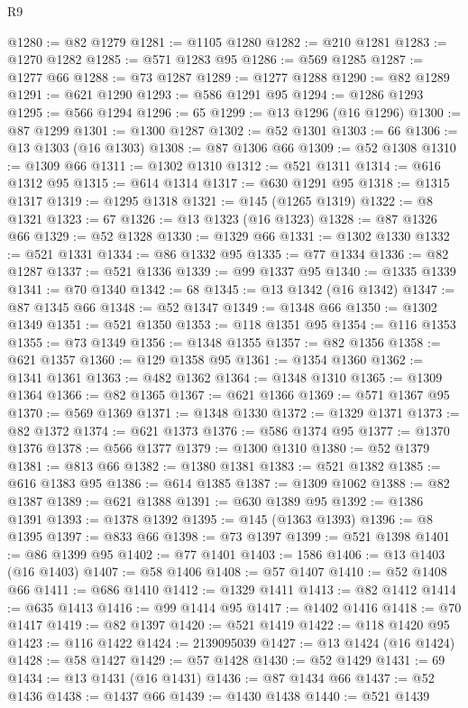 \begin{lexlean}{R9}
\begin{coremodule}
@1280 := @82 @1279
@1281 := @1105 @1280
@1282 := @210 @1281
@1283 := @1270 @1282
@1285 := @571 @1283 @95
@1286 := @569 @1285
@1287 := @1277 @66
@1288 := @73 @1287
@1289 := @1277 @1288
@1290 := @82 @1289
@1291 := @621 @1290
@1293 := @586 @1291 @95
@1294 := @1286 @1293
@1295 := @566 @1294
@1296 := 65
@1299 := @13 @1296 (@16 @1296)
@1300 := @87 @1299
@1301 := @1300 @1287
@1302 := @52 @1301
@1303 := 66
@1306 := @13 @1303 (@16 @1303)
@1308 := @87 @1306 @66
@1309 := @52 @1308
@1310 := @1309 @66
@1311 := @1302 @1310
@1312 := @521 @1311
@1314 := @616 @1312 @95
@1315 := @614 @1314
@1317 := @630 @1291 @95
@1318 := @1315 @1317
@1319 := @1295 @1318
@1321 := @145 (@1265 @1319)
@1322 := @8 @1321
@1323 := 67
@1326 := @13 @1323 (@16 @1323)
@1328 := @87 @1326 @66
@1329 := @52 @1328
@1330 := @1329 @66
@1331 := @1302 @1330
@1332 := @521 @1331
@1334 := @86 @1332 @95
@1335 := @77 @1334
@1336 := @82 @1287
@1337 := @521 @1336
@1339 := @99 @1337 @95
@1340 := @1335 @1339
@1341 := @70 @1340
@1342 := 68
@1345 := @13 @1342 (@16 @1342)
@1347 := @87 @1345 @66
@1348 := @52 @1347
@1349 := @1348 @66
@1350 := @1302 @1349
@1351 := @521 @1350
@1353 := @118 @1351 @95
@1354 := @116 @1353
@1355 := @73 @1349
@1356 := @1348 @1355
@1357 := @82 @1356
@1358 := @621 @1357
@1360 := @129 @1358 @95
@1361 := @1354 @1360
@1362 := @1341 @1361
@1363 := @482 @1362
@1364 := @1348 @1310
@1365 := @1309 @1364
@1366 := @82 @1365
@1367 := @621 @1366
@1369 := @571 @1367 @95
@1370 := @569 @1369
@1371 := @1348 @1330
@1372 := @1329 @1371
@1373 := @82 @1372
@1374 := @621 @1373
@1376 := @586 @1374 @95
@1377 := @1370 @1376
@1378 := @566 @1377
@1379 := @1300 @1310
@1380 := @52 @1379
@1381 := @813 @66
@1382 := @1380 @1381
@1383 := @521 @1382
@1385 := @616 @1383 @95
@1386 := @614 @1385
@1387 := @1309 @1062
@1388 := @82 @1387
@1389 := @621 @1388
@1391 := @630 @1389 @95
@1392 := @1386 @1391
@1393 := @1378 @1392
@1395 := @145 (@1363 @1393)
@1396 := @8 @1395
@1397 := @833 @66
@1398 := @73 @1397
@1399 := @521 @1398
@1401 := @86 @1399 @95
@1402 := @77 @1401
@1403 := 1586
@1406 := @13 @1403 (@16 @1403)
@1407 := @58 @1406
@1408 := @57 @1407
@1410 := @52 @1408 @66
@1411 := @686 @1410
@1412 := @1329 @1411
@1413 := @82 @1412
@1414 := @635 @1413
@1416 := @99 @1414 @95
@1417 := @1402 @1416
@1418 := @70 @1417
@1419 := @82 @1397
@1420 := @521 @1419
@1422 := @118 @1420 @95
@1423 := @116 @1422
@1424 := 2139095039
@1427 := @13 @1424 (@16 @1424)
@1428 := @58 @1427
@1429 := @57 @1428
@1430 := @52 @1429
@1431 := 69
@1434 := @13 @1431 (@16 @1431)
@1436 := @87 @1434 @66
@1437 := @52 @1436
@1438 := @1437 @66
@1439 := @1430 @1438
@1440 := @521 @1439

\end{coremodule}
\end{lexlean}
